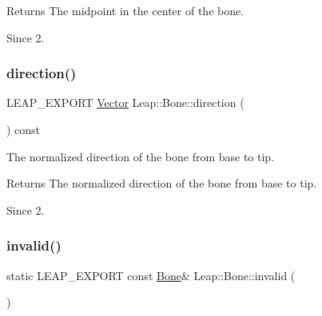 \begin{DoxyCodeInclude}
\end{DoxyCodeInclude}


\begin{DoxyReturn}{Returns}
The midpoint in the center of the bone. 
\end{DoxyReturn}
\begin{DoxySince}{Since}
2. 
\end{DoxySince}
\mbox{\label{class_leap_1_1_bone_a15296070d028b684811d5aa555933ad7}} 
\subsubsection{\texorpdfstring{direction()}{direction()}}
{\footnotesize\ttfamily L\+E\+A\+P\+\_\+\+E\+X\+P\+O\+RT \hyperlink{struct_leap_1_1_vector}{Vector} Leap\+::\+Bone\+::direction (\begin{DoxyParamCaption}{ }\end{DoxyParamCaption}) const}

The normalized direction of the bone from base to tip.


\begin{DoxyCodeInclude}
\end{DoxyCodeInclude}


\begin{DoxyReturn}{Returns}
The normalized direction of the bone from base to tip. 
\end{DoxyReturn}
\begin{DoxySince}{Since}
2. 
\end{DoxySince}
\mbox{\label{class_leap_1_1_bone_a5751c0c4533daf8332aa48b986e75cc2}} 
\subsubsection{\texorpdfstring{invalid()}{invalid()}}
{\footnotesize\ttfamily static L\+E\+A\+P\+\_\+\+E\+X\+P\+O\+RT const \hyperlink{class_leap_1_1_bone}{Bone}\& Leap\+::\+Bone\+::invalid (\begin{DoxyParamCaption}{ }\end{DoxyParamCaption})\hspace{0.3cm}{\ttfamily [static]}}

